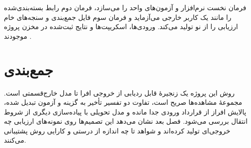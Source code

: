 فرمان نخست نرم‌افزار و آزمون‌های واحد را می‌سازد، فرمان دوم رابط بسته‌بندی‌شده را مانند یک کاربر خارجی می‌آزماید و فرمان سوم فایل جمع‌بندی و سنجه‌های خام ارزیابی را از نو تولید می‌کند. ورودی‌ها، اسکریپت‌ها و نتایج ثبت‌شده در مخزن پروژه موجودند \cite{AfraWeakTimedReduction2026}.

\section{جمع‌بندی}

روش این پروژه یک زنجیرهٔ قابل ردیابی از خروجی  افرا تا مدل خارج‌قسمتی است. مجموعهٔ مشاهده‌ها صریح است، تفاوت دو تفسیر تأخیر به گزینه و آزمون تبدیل شده، پالایش افراز از قرارداد ورودی جدا مانده و مدل تحویلی با پیاده‌سازی دیگری از شروط انتقال بررسی می‌شود. فصل بعد نشان می‌دهد این تصمیم‌ها روی نمونه‌های ارزیابی چه خروجی‌ای تولید کرده‌اند و شواهد تا چه اندازه از درستی و کارایی روش پشتیبانی می‌کنند.
